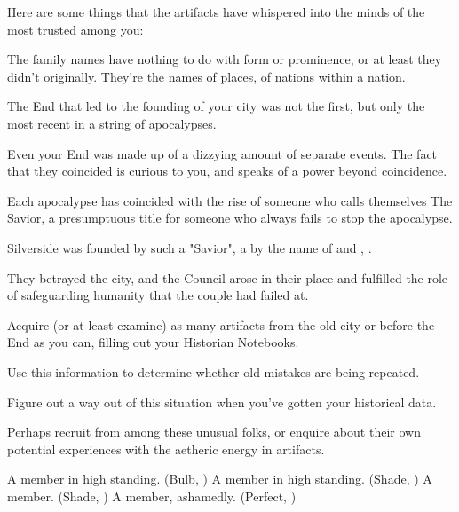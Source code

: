 \documentclass[blue]{Silversiders}
\begin{document}
Here are some things that the artifacts have whispered into the minds of the most trusted among you:
\begin{itemz}
	\item The family names have nothing to do with form or prominence, or at least they didn't originally. They're the names of places, of nations within a nation.
	\item The End that led to the founding of your city was not the first, but only the most recent in a string of apocalypses.
	\item Even your End was made up of a dizzying amount of separate events. The fact that they coincided is curious to you, and speaks of a power beyond coincidence.
	\item Each apocalypse has coincided with the rise of someone who calls themselves The Savior, a presumptuous title for someone who always fails to stop the apocalypse.
	\item Silverside was founded by such a "Savior", a \cSavior{\human} by the name of \cSavior{\full} and \cSavior{\their} \cIngenuityOld{\spouse}, \cIngenuityOld{\full}.
	\item They betrayed the city, and the Council arose in their place and fulfilled the role of safeguarding humanity that the couple had failed at.
\end{itemz}

\begin{itemz}[Goals]
	\item Acquire (or at least examine) as many artifacts from the old city or before the End as you can, filling out your Historian Notebooks.
	\item Use this information to determine whether old mistakes are being repeated.
	\item Figure out a way out of this situation when you've gotten your historical data.
	\item Perhaps recruit from among these unusual folks, or enquire about their own potential experiences with the aetheric energy in artifacts.
\end{itemz}

\begin{members}
	\member{\cHonor{}} A member in high standing. (Bulb, \cHonor{\Sex})
	\member{\cLove{}} A member in high standing. (Shade, \cLove{\Sex})
	\member{\cWisdom{}} A member. (Shade, \cWisdom{\Sex})
	\member{\cPestilence{}} A member, ashamedly. (Perfect, \cPestilence{\Sex})
	
\end{members}
\end{document}
